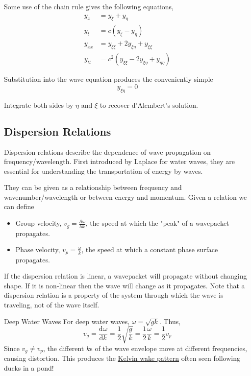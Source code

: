 \documentclass[12pt]{article}
\def\D{\mathrm{d}}
\newcommand{\diff}[3][]{\ensuremath{\frac{\D^{#1} #2}{\D #3^{#1}}}}
\newcommand{\partials}[3][]{\ensuremath{\frac{\partial^{#1} {#2}}{\partial {#3}^{#1}}}}
\begin{document}
Some use of the chain rule gives the following equations,
\begin{equation}
	\begin{aligned}
		y_x &= y_{\xi} + y_{\eta}\\
		y_t &= c(y_{\xi} - y_{\eta})\\
		y_{xx} &= y_{\xi\xi} + 2y_{\xi\eta} + y_{\xi\xi}\\
		y_{tt} &= c^2(y_{\xi\xi} - 2y_{\xi\eta} + y_{\eta\eta})
	\end{aligned}
\end{equation}

Substitution into the wave equation produces the conveniently simple
\begin{equation}
	y_{\xi\eta} = 0
\end{equation}

Integrate both sides by $\eta$ and $\xi$ to recover d'Alembert's solution.

\subsection{Dispersion Relations}
\label{sec:dispersionrel}

Dispersion relations describe the dependence of wave propagation on frequency/wavelength. First introduced by Laplace for water waves, they are essential for understanding the transportation of energy by waves.

\indent\hspace{15pt} They can be given as a relationship between frequency and wavenumber/wavelength or between energy and momentum. Given a relation we can define
\begin{itemize}
	\item Group velocity, $v_g = \partials{\omega}{k}$, the speed at which the "peak" of a wavepacket propagates.
	\item Phase velocity, $v_p = \frac{\omega}{k}$, the speed at which a constant phase surface propagates.
\end{itemize}

If the dispersion relation is linear, a wavepacket will propagate without changing shape. If it is non-linear then the wave will change as it propagates. Note that a dispersion relation is a property of the system through which the wave is traveling, not of the wave itself.

\begin{example}{Deep Water Waves}{}
	For deep water waves, $\omega = \sqrt{gk}$. Thus,
	\begin{equation*}
		v_g = \diff[]{\omega}{k} = \frac{1}{2} \sqrt{\frac{g}{k}} = \frac{1}{2}\frac{\omega}{k} = \frac{1}{2} v_p
	\end{equation*}
	Since $v_g \neq v_p$, the different $k$s of the wave envelope move at different frequencies, causing distortion. This produces the \href{https://en.wikipedia.org/wiki/Kelvin_wake_pattern}{Kelvin wake pattern} often seen following ducks in a pond!
\end{example}
\end{document}
